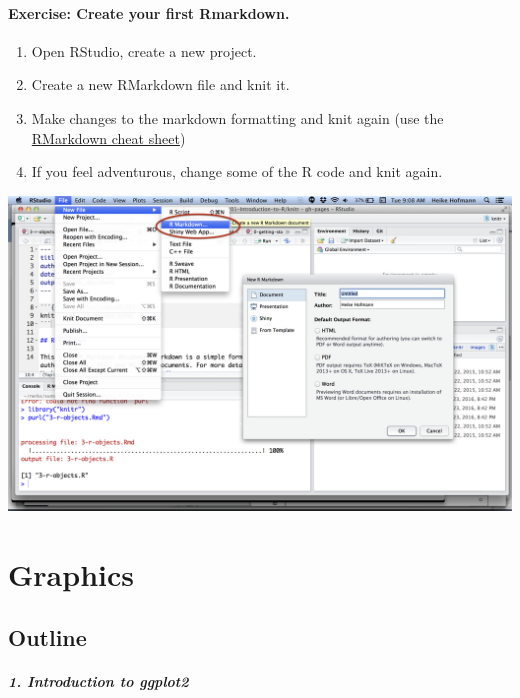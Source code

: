 \documentclass[
]{book}
\providecommand{\tightlist}{%
  \setlength{\itemsep}{0pt}\setlength{\parskip}{0pt}}
\begin{document}
\hypertarget{exercise-create-your-first-rmarkdown.}{%
\subsubsection*{Exercise: Create your first Rmarkdown.}\label{exercise-create-your-first-rmarkdown.}}

\begin{enumerate}
\def\labelenumi{\arabic{enumi}.}
\tightlist
\item
  Open RStudio, create a new project.
\item
  Create a new RMarkdown file and knit it.
\item
  Make changes to the markdown formatting and knit again (use the \href{https://www.rstudio.com/resources/cheatsheets/}{RMarkdown cheat sheet})
\item
  If you feel adventurous, change some of the R code and knit again.
\end{enumerate}

\includegraphics[width=24in]{img/hello-rmarkdown}

\hypertarget{graphics}{%
\chapter{Graphics}\label{graphics}}

\hypertarget{outline}{%
\section*{Outline}\label{outline}}

\hypertarget{introduction-to-ggplot2}{%
\paragraph*{1. Introduction to ggplot2}\label{introduction-to-ggplot2}}
\end{document}
